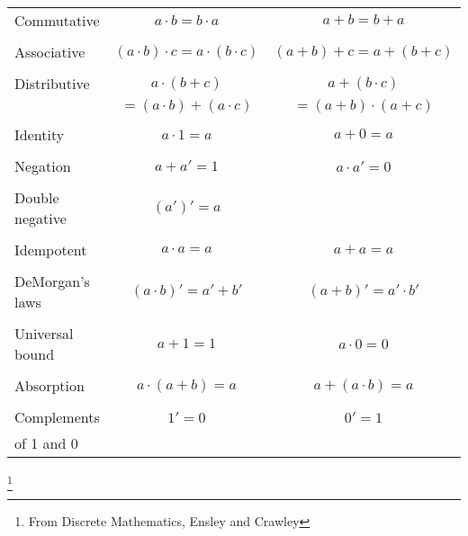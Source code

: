 \documentclass[a4paper,12pt]{book}
\begin{document}
        \begin{introNOHEAD}
            \begin{tabular}{l | c | c}
                Commutative & $a \cdot b = b \cdot a$ & $a + b = b + a$ \\ & & \\
                Associative & $(a \cdot b) \cdot c = a \cdot (b \cdot c)$ & $(a + b) + c = a + (b + c)$ \\ & & \\
                Distributive & $a \cdot (b + c)$ & $a + (b \cdot c)$ \\
                & $= (a \cdot b) + (a \cdot c)$ & $= (a + b) \cdot (a + c)$ \\ & & \\
                Identity & $a \cdot 1 = a$ & $a + 0 = a$ \\ & & \\
                Negation & $a + a' = 1$ & $a \cdot a' = 0$ \\& &  \\
                Double negative & $(a')' = a$ \\ & & \\
                Idempotent & $a \cdot a = a$ & $a + a = a$ \\& &  \\
                DeMorgan's laws & $(a \cdot b)' = a' + b'$ & $(a + b)' = a' \cdot b'$ \\& &  \\
                Universal bound & $a + 1 = 1$ & $a \cdot 0 = 0$ \\& &  \\
                Absorption & $a \cdot (a + b) = a$ & $a + (a \cdot b) = a$ \\ & & \\
                Complements & $1' = 0$ & $0' = 1$ \\
                of 1 and 0
            \end{tabular}
            \footnote{From Discrete Mathematics, Ensley and Crawley}
        \end{introNOHEAD}
\end{document}
